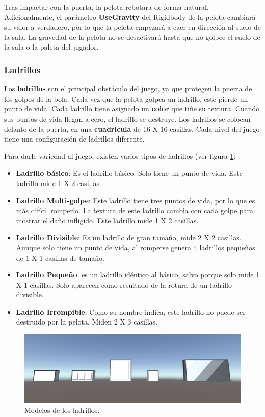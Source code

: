 Tras impactar con la puerta, la pelota rebotara de forma natural. Adicionalmente, el parámetro \textbf{UseGravity} del Rigidbody de la pelota cambiará su valor a verdadero, por lo que la pelota empezará a caer en dirección al suelo de la sala. La gravedad de la pelota no se desactivará hasta que no golpee el suelo de la sala o la paleta del jugador.

\subsubsection{Ladrillos}
Los \textbf{ladrillos} son el principal obstáculo del juego, ya que protegen la puerta de los golpes de la bola. Cada vez que la pelota golpea un ladrillo, este pierde un punto de vida. Cada ladrillo tiene asignado un \textbf{color} que tiñe su textura. Cuando sus puntos de vida llegan a cero, el ladrillo se destruye. Los ladrillos se colocan delante de la puerta, en una \textbf{cuadricula} de 16 X 16 casillas. Cada nivel del juego tiene una configuración de ladrillos diferente. 

Para darle variedad al juego, existen varios tipos de ladrillos (ver figura \ref{bricks_models}:
\begin{itemize}
\item \textbf{Ladrillo básico}: Es el ladrillo básico. Solo tiene un punto de vida. Este ladrillo mide 1 X 2 casillas.
\item \textbf{Ladrillo Multi-golpe}: Este ladrillo tiene tres puntos de vida, por lo que es más difícil romperlo. La textura de este ladrillo cambia con cada golpe para mostrar el daño infligido. Este ladrillo mide 1 X 2 casillas.
\item \textbf{Ladrillo Divisible}: Es un ladrillo de gran tamaño, mide 2 X 2 casillas. Aunque solo tiene un punto de vida, al romperse genera 4 ladrillos pequeños de 1 X 1 casillas de tamaño.
\item \textbf{Ladrillo Pequeño}: es un ladrillo idéntico al básico, salvo porque solo mide 1 X 1 casillas. Solo aparecen como resultado de la rotura de un ladrillo divisible.
\item \textbf{Ladrillo Irrompible}: Como su nombre indica, este ladrillo no puede ser destruido por la pelota. Miden 2 X 3 casillas.
\end{itemize}
\begin{figure}[h]
	\includegraphics[width=1\textwidth]{images/estructura/fisica/brick_examples}
	\centering
	\caption{Modelos de los ladrillos.}
	\label{bricks_models}
\end{figure}

